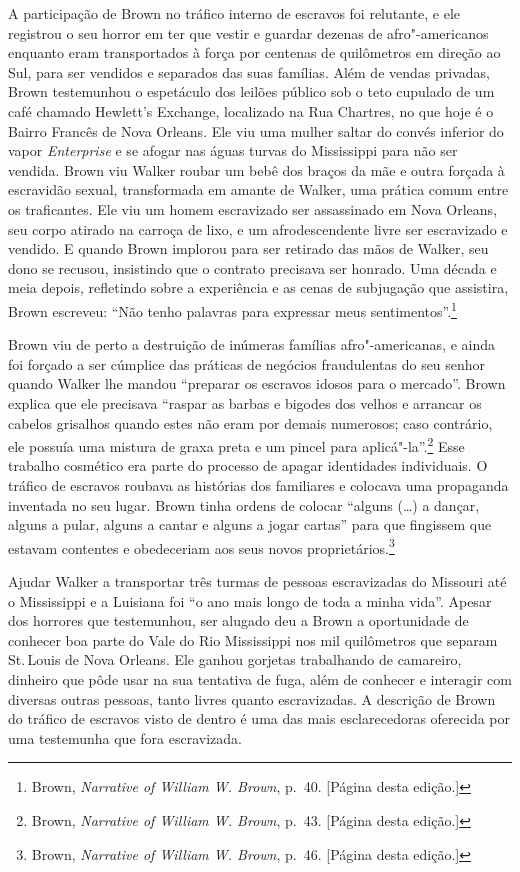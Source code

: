 A participação de Brown no tráfico interno de escravos foi relutante, e
ele registrou o seu horror em ter que vestir e guardar dezenas de
afro"-americanos enquanto eram transportados à força por centenas de
quilômetros em direção ao Sul, para ser vendidos e separados das suas
famílias. Além de vendas privadas, Brown testemunhou o espetáculo dos
leilões público sob o teto cupulado de um café chamado Hewlett's
Exchange, localizado na Rua Chartres, no que hoje é o Bairro Francês de
Nova Orleans. Ele viu uma mulher saltar do convés inferior do vapor
\emph{Enterprise} e se afogar nas águas turvas do Mississippi para não
ser vendida. Brown viu Walker roubar um bebê dos braços da mãe e outra
forçada à escravidão sexual, transformada em amante de Walker, uma
prática comum entre os traficantes. Ele viu um homem escravizado ser
assassinado em Nova Orleans, seu corpo atirado na carroça de lixo, e um
afrodescendente livre ser escravizado e vendido. E quando Brown implorou
para ser retirado das mãos de Walker, seu dono se recusou, insistindo
que o contrato precisava ser honrado. Uma década e meia depois,
refletindo sobre a experiência e as cenas de subjugação que assistira,
Brown escreveu: ``Não tenho palavras para expressar meus
sentimentos''.\footnote{Brown, \emph{Narrative of William W. Brown}, p.~40.
  {[}Página \pageref{ref6} desta edição.{]}}

Brown viu de perto a destruição de inúmeras famílias afro"-americanas, e
ainda foi forçado a ser cúmplice das práticas de negócios fraudulentas
do seu senhor quando Walker lhe mandou ``preparar os escravos
idosos para o mercado''. Brown explica que ele precisava ``raspar as
barbas e bigodes dos velhos e arrancar os cabelos grisalhos quando estes
não eram por demais numerosos; caso contrário, ele possuía uma mistura
de graxa preta e um pincel para aplicá"-la''.\footnote{Brown,
  \emph{Narrative of William W. Brown}, p.~43. {[}Página \pageref{ref7} desta
  edição.{]}} Esse trabalho cosmético era parte do processo de apagar
identidades individuais. O tráfico de escravos roubava as histórias dos
familiares e colocava uma propaganda inventada no seu lugar. Brown tinha
ordens de colocar ``alguns (\ldots{}) a dançar, alguns a pular, alguns a
cantar e alguns a jogar cartas'' para que fingissem que estavam
contentes e obedeceriam aos seus novos proprietários.\footnote{Brown,
  \emph{Narrative of William W. Brown}, p.~46. {[}Página \pageref{ref8} desta
  edição.{]}}

Ajudar Walker a transportar três turmas de pessoas escravizadas do
Missouri até o Mississippi e a Luisiana foi ``o ano mais longo de toda a
minha vida''. Apesar dos horrores que testemunhou, ser alugado deu a
Brown a oportunidade de conhecer boa parte do Vale do Rio Mississippi
nos mil quilômetros que separam St.\,Louis de Nova Orleans. Ele ganhou
gorjetas trabalhando de camareiro, dinheiro que pôde usar na sua
tentativa de fuga, além de conhecer e interagir com diversas outras
pessoas, tanto livres quanto escravizadas. A descrição de Brown do
tráfico de escravos visto de dentro é uma das mais esclarecedoras
oferecida por uma testemunha que fora escravizada.

